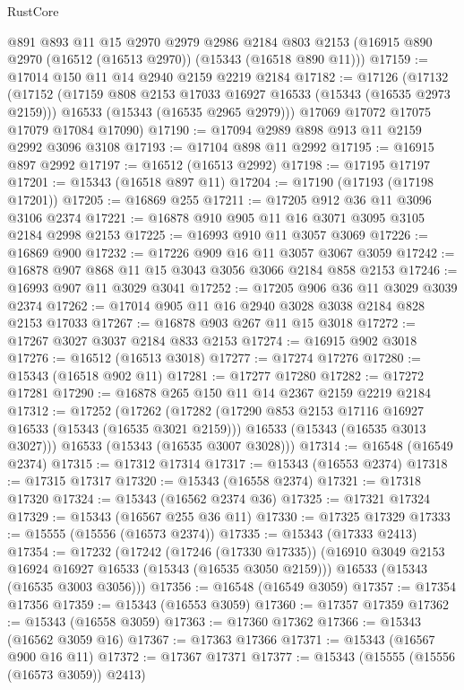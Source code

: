 \begin{lexlean}{RustCore}
\begin{coremodule}
    @891
    @893
    @11
    @15
    @2970
    @2979
    @2986
    @2184
    @803
    @2153
    (@16915 @890 @2970 (@16512 (@16513 @2970)) (@15343 (@16518 @890 @11)))
@17159 := @17014 @150 @11 @14 @2940 @2159 @2219 @2184
@17182 := @17126
    (@17132
      (@17152
        (@17159 @808 @2153 @17033 @16927 @16533 (@15343 (@16535 @2973 @2159)))
        @16533
        (@15343 (@16535 @2965 @2979)))
      @17069
      @17072
      @17075
      @17079
      @17084
      @17090)
@17190 := @17094 @2989 @898 @913 @11 @2159 @2992 @3096 @3108
@17193 := @17104 @898 @11 @2992
@17195 := @16915 @897 @2992
@17197 := @16512 (@16513 @2992)
@17198 := @17195 @17197
@17201 := @15343 (@16518 @897 @11)
@17204 := @17190 (@17193 (@17198 @17201))
@17205 := @16869 @255
@17211 := @17205 @912 @36 @11 @3096 @3106 @2374
@17221 := @16878 @910 @905 @11 @16 @3071 @3095 @3105 @2184 @2998 @2153
@17225 := @16993 @910 @11 @3057 @3069
@17226 := @16869 @900
@17232 := @17226 @909 @16 @11 @3057 @3067 @3059
@17242 := @16878 @907 @868 @11 @15 @3043 @3056 @3066 @2184 @858 @2153
@17246 := @16993 @907 @11 @3029 @3041
@17252 := @17205 @906 @36 @11 @3029 @3039 @2374
@17262 := @17014 @905 @11 @16 @2940 @3028 @3038 @2184 @828 @2153 @17033
@17267 := @16878 @903 @267 @11 @15 @3018
@17272 := @17267 @3027 @3037 @2184 @833 @2153
@17274 := @16915 @902 @3018
@17276 := @16512 (@16513 @3018)
@17277 := @17274 @17276
@17280 := @15343 (@16518 @902 @11)
@17281 := @17277 @17280
@17282 := @17272 @17281
@17290 := @16878 @265 @150 @11 @14 @2367 @2159 @2219 @2184
@17312 := @17252
    (@17262
      (@17282
        (@17290 @853 @2153 @17116 @16927 @16533 (@15343 (@16535 @3021 @2159)))
        @16533
        (@15343 (@16535 @3013 @3027)))
      @16533
      (@15343 (@16535 @3007 @3028)))
@17314 := @16548 (@16549 @2374)
@17315 := @17312 @17314
@17317 := @15343 (@16553 @2374)
@17318 := @17315 @17317
@17320 := @15343 (@16558 @2374)
@17321 := @17318 @17320
@17324 := @15343 (@16562 @2374 @36)
@17325 := @17321 @17324
@17329 := @15343 (@16567 @255 @36 @11)
@17330 := @17325 @17329
@17333 := @15555 (@15556 (@16573 @2374))
@17335 := @15343 (@17333 @2413)
@17354 := @17232
    (@17242
      (@17246 (@17330 @17335))
      (@16910 @3049 @2153 @16924 @16927 @16533 (@15343 (@16535 @3050 @2159)))
      @16533
      (@15343 (@16535 @3003 @3056)))
@17356 := @16548 (@16549 @3059)
@17357 := @17354 @17356
@17359 := @15343 (@16553 @3059)
@17360 := @17357 @17359
@17362 := @15343 (@16558 @3059)
@17363 := @17360 @17362
@17366 := @15343 (@16562 @3059 @16)
@17367 := @17363 @17366
@17371 := @15343 (@16567 @900 @16 @11)
@17372 := @17367 @17371
@17377 := @15343 (@15555 (@15556 (@16573 @3059)) @2413)

\end{coremodule}
\end{lexlean}

